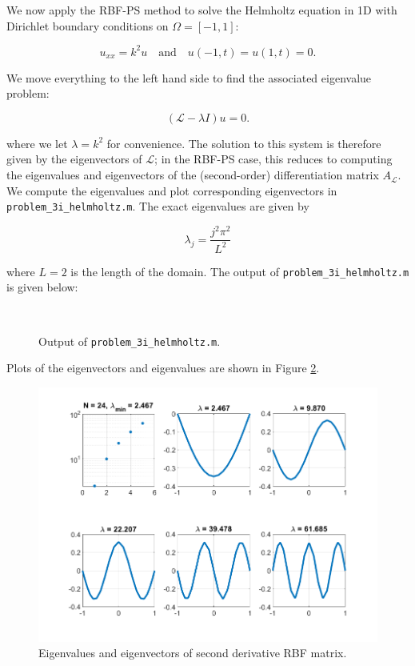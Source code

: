 \begin{solution}
    \pagebreak
    We now apply the RBF-PS method to solve the Helmholtz equation in 1D with Dirichlet boundary conditions on 
    $\Omega = [-1, 1]$:

    $$
    u_{xx} = k^2 u \quad \text{and} \quad u(-1, t) = u(1, t) = 0. 
    $$

    We move everything to the left hand side to find the associated eigenvalue problem:

    $$
    \left( \mathcal{L} - \lambda I \right) u = 0.
    $$

    where we let $\lambda = k^2$ for convenience. The solution to this system is therefore given by the eigenvectors of 
    $\mathcal{L}$; in the RBF-PS case, this reduces to computing the eigenvalues and eigenvectors of the (second-order) 
    differentiation matrix $A_{\mathcal{L}}$. We compute the eigenvalues and plot corresponding eigenvectors in 
    \texttt{problem\_3i\_helmholtz.m}. The exact eigenvalues are given by 
    
    $$
    \lambda_j = \frac{j^2 \pi^2}{L^2}
    $$
    
    where $L = 2$ is the length of the domain. The output of \texttt{problem\_3i\_helmholtz.m} is given below:

    \begin{figure}[h]
        \begin{verbatim}
            
        \end{verbatim}
        \caption{Output of \texttt{problem\_3i\_helmholtz.m}.}
        \label{fig:problem_3i_helmholtz_output}
    \end{figure}

    \pagebreak
    Plots of the eigenvectors and eigenvalues are shown in Figure \ref{fig:problem_3i_helmholtz_eig}.

    \begin{figure}[h]
        \centering
        \includegraphics*[width=\textwidth]{problem_3i_helmholtz.png}
        \caption{Eigenvalues and eigenvectors of second derivative RBF matrix.}
        \label{fig:problem_3i_helmholtz_eig}
    \end{figure}
\end{solution}